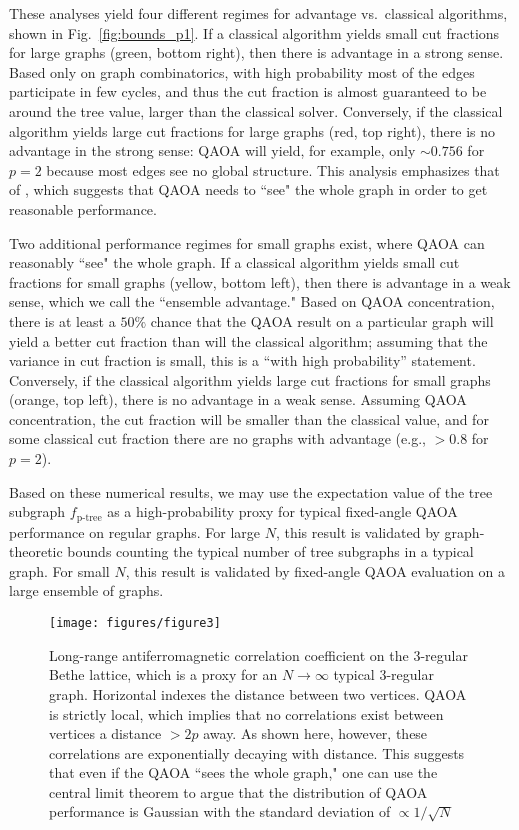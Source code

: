 These analyses yield four different regimes for advantage vs.~classical algorithms, shown in Fig.~\ref{fig:bounds_p1}. If a classical algorithm yields small cut fractions for large graphs (green, bottom right), then there is advantage in a strong sense. Based only on graph combinatorics, with high probability most of the edges participate in few cycles, and thus the cut fraction is almost guaranteed to be around the tree value, larger than the classical solver. Conversely, if the classical algorithm yields large cut fractions for large graphs (red, top right), there is no advantage in the strong sense: QAOA will  yield, for example, only $\sim 0.756$ for $p=2$ because most edges see no global structure. This analysis emphasizes that of \cite{farhi2020quantum}, which suggests that QAOA needs to ``see" the whole graph in order to get reasonable performance.

Two additional performance regimes for small graphs exist, where QAOA can reasonably ``see" the whole graph. If a classical algorithm yields small cut fractions for small graphs (yellow, bottom left), then there is advantage in a weak sense, which we call the ``ensemble advantage." Based on QAOA concentration, there is at least a $50\%$ chance that the QAOA result on a particular graph will yield a better cut fraction than will the classical algorithm; assuming that the variance in cut fraction is small, this is a ``with high probability'' statement. Conversely, if the classical algorithm yields large cut fractions for small graphs (orange, top left), there is no advantage in a weak sense. Assuming QAOA concentration, the cut fraction will be smaller than the classical value, and for some classical cut fraction there are no graphs with advantage (e.g., $>0.8$ for $p=2$).

Based on these numerical results, we may use the expectation value of the tree subgraph $f_\text{p-tree}$ as a high-probability proxy for typical fixed-angle QAOA performance on regular graphs. For large $N$, this result is validated by graph-theoretic bounds counting the typical number of tree subgraphs in a typical graph. For small $N$, this result is validated by fixed-angle QAOA evaluation on a large ensemble of graphs.

\begin{figure}
    \centering
    \texttt{[image: figures/figure3]}
    \caption{Long-range antiferromagnetic correlation coefficient on the 3-regular Bethe lattice, which is a proxy for an $N\to\infty$ typical 3-regular graph. Horizontal indexes the distance between two vertices.  QAOA is strictly local, which implies that  no correlations exist between vertices a distance $>2p$ away. As shown here, however, these correlations are exponentially decaying with distance. This suggests that even if the QAOA ``sees the whole graph," one can use the central limit theorem to argue that the distribution of QAOA performance is  Gaussian with the standard deviation of $\propto 1/\sqrt N$}
    \label{fig:longrange_correlations}
\end{figure}

